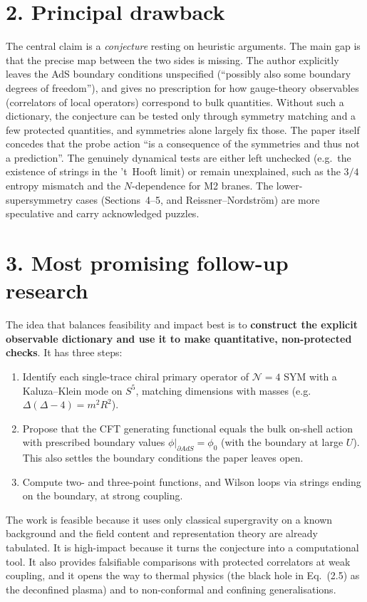 \documentclass[11pt]{article}
\begin{document}
\section*{2. Principal drawback}
The central claim is a \emph{conjecture} resting on heuristic arguments. The main gap is that the precise map between the two sides is missing. The author explicitly leaves the AdS boundary conditions unspecified (``possibly also some boundary degrees of freedom''), and gives no prescription for how gauge-theory observables (correlators of local operators) correspond to bulk quantities. Without such a dictionary, the conjecture can be tested only through symmetry matching and a few protected quantities, and symmetries alone largely fix those. The paper itself concedes that the probe action ``is a consequence of the symmetries and thus not a prediction''. The genuinely dynamical tests are either left unchecked (e.g.\ the existence of strings in the 't~Hooft limit) or remain unexplained, such as the $3/4$ entropy mismatch and the $N$-dependence for M2 branes. The lower-supersymmetry cases (Sections~4--5, and Reissner--Nordstr\"om) are more speculative and carry acknowledged puzzles.

\section*{3. Most promising follow-up research}
The idea that balances feasibility and impact best is to \textbf{construct the explicit observable dictionary and use it to make quantitative, non-protected checks}. It has three steps:
\begin{enumerate}
\item Identify each single-trace chiral primary operator of $\mathcal{N}=4$ SYM with a Kaluza--Klein mode on $S^5$, matching dimensions with masses (e.g.\ $\Delta(\Delta-4)=m^2R^2$).
\item Propose that the CFT generating functional equals the bulk on-shell action with prescribed boundary values $\phi|_{\partial AdS}=\phi_0$ (with the boundary at large $U$). This also settles the boundary conditions the paper leaves open.
\item Compute two- and three-point functions, and Wilson loops via strings ending on the boundary, at strong coupling.
\end{enumerate}
The work is feasible because it uses only classical supergravity on a known background and the field content and representation theory are already tabulated. It is high-impact because it turns the conjecture into a computational tool. It also provides falsifiable comparisons with protected correlators at weak coupling, and it opens the way to thermal physics (the black hole in Eq.~(2.5) as the deconfined plasma) and to non-conformal and confining generalisations.
\end{document}
